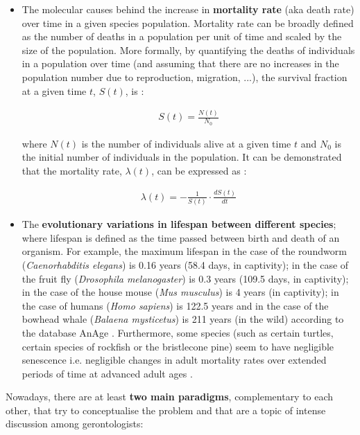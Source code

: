 \begin{itemize}
	
	\item The molecular causes behind the increase in \textbf{mortality rate} (aka death rate) over time in a given species population. Mortality rate can be broadly defined as the number of deaths in a population per unit of time and scaled by the size of the population. More formally, by quantifying the deaths of individuals in a population over time (and assuming that there are no increases in the population number due to reproduction, migration, ...), the survival fraction at a given time $t$, $S(t)$, is \cite{Witten1986}:
	
	\begin{align}
	S(t) = \frac{N(t)}{N_0}
	\end{align}
	
	where $N(t)$ is the number of individuals alive at a given time $t$ and $N_0$ is the initial number of individuals in the population. It can be demonstrated that the mortality rate, $\lambda(t)$, can be expressed as \cite{Witten1986}:
	
	\begin{align} \label{eq:1.2}
	\lambda(t) = - \frac{1}{S(t)} \cdot \frac{dS(t)}{dt}
	\end{align}
	
	\item The \textbf{evolutionary variations in lifespan between different species}; where lifespan is defined as the time passed between birth and death of an organism. For example, the maximum lifespan in the case of the roundworm (\textit{Caenorhabditis elegans}) is 0.16 years (58.4 days, in captivity); in the case of the fruit fly (\textit{Drosophila melanogaster}) is 0.3 years (109.5 days, in captivity); in the case of the house mouse (\textit{Mus musculus}) is 4 years (in captivity); in the case of humans (\textit{Homo sapiens}) is 122.5 years and in the case of the bowhead whale (\textit{Balaena mysticetus}) is 211 years (in the wild) according to the database AnAge \cite{DEMAGALHAES2009}. Furthermore, some species (such as certain turtles, certain species of rockfish or the bristlecone pine) seem to have negligible senescence i.e. negligible changes in adult mortality rates over extended periods of time at advanced adult ages \cite{Finch2009}.   
	
\end{itemize}

Nowadays, there are at least \textbf{two main paradigms}, complementary to each other, that try to conceptualise the problem and that are a topic of intense discussion among gerontologists:

